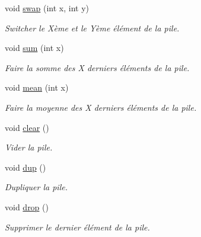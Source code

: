 \begin{DoxyCompactItemize}
void \hyperlink{classcalcul_1_1_pile_cst_ad687b59960ffff0b3a36d9dafdbf546a}{swap} (int x, int y)
\begin{DoxyCompactList}\small\item\em Switcher le Xème et le Yème élément de la pile. \end{DoxyCompactList}\item 
void \hyperlink{classcalcul_1_1_pile_cst_a1e25dc8e3658e4e06be47fa14101774e}{sum} (int x)
\begin{DoxyCompactList}\small\item\em Faire la somme des X derniers éléments de la pile. \end{DoxyCompactList}\item 
void \hyperlink{classcalcul_1_1_pile_cst_ae8b52165e301c368e3720abed2b29fd2}{mean} (int x)
\begin{DoxyCompactList}\small\item\em Faire la moyenne des X derniers éléments de la pile. \end{DoxyCompactList}\item 
\hypertarget{classcalcul_1_1_pile_cst_ac44eb9d53d49d03f724e23d50fd1fa9d}{void \hyperlink{classcalcul_1_1_pile_cst_ac44eb9d53d49d03f724e23d50fd1fa9d}{clear} ()}\label{classcalcul_1_1_pile_cst_ac44eb9d53d49d03f724e23d50fd1fa9d}

\begin{DoxyCompactList}\small\item\em Vider la pile. \end{DoxyCompactList}\item 
\hypertarget{classcalcul_1_1_pile_cst_a7eb7097c900a9c68a32d8adbf0040cd5}{void \hyperlink{classcalcul_1_1_pile_cst_a7eb7097c900a9c68a32d8adbf0040cd5}{dup} ()}\label{classcalcul_1_1_pile_cst_a7eb7097c900a9c68a32d8adbf0040cd5}

\begin{DoxyCompactList}\small\item\em Dupliquer la pile. \end{DoxyCompactList}\item 
\hypertarget{classcalcul_1_1_pile_cst_a937c81c5a8fbeaa48a83351357d1a163}{void \hyperlink{classcalcul_1_1_pile_cst_a937c81c5a8fbeaa48a83351357d1a163}{drop} ()}\label{classcalcul_1_1_pile_cst_a937c81c5a8fbeaa48a83351357d1a163}

\begin{DoxyCompactList}\small\item\em Supprimer le dernier élément de la pile. \end{DoxyCompactList}\end{DoxyCompactItemize}
